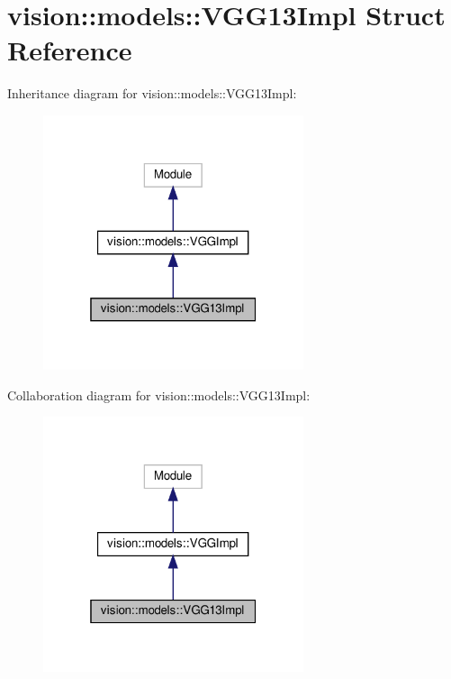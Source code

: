 \hypertarget{structvision_1_1models_1_1VGG13Impl}{}\section{vision\+:\+:models\+:\+:V\+G\+G13\+Impl Struct Reference}
\label{structvision_1_1models_1_1VGG13Impl}


Inheritance diagram for vision\+:\+:models\+:\+:V\+G\+G13\+Impl\+:
\nopagebreak
\begin{figure}[H]
\begin{center}
\leavevmode
\includegraphics[width=217pt]{structvision_1_1models_1_1VGG13Impl__inherit__graph}
\end{center}
\end{figure}


Collaboration diagram for vision\+:\+:models\+:\+:V\+G\+G13\+Impl\+:
\nopagebreak
\begin{figure}[H]
\begin{center}
\leavevmode
\includegraphics[width=217pt]{structvision_1_1models_1_1VGG13Impl__coll__graph}
\end{center}
\end{figure}
